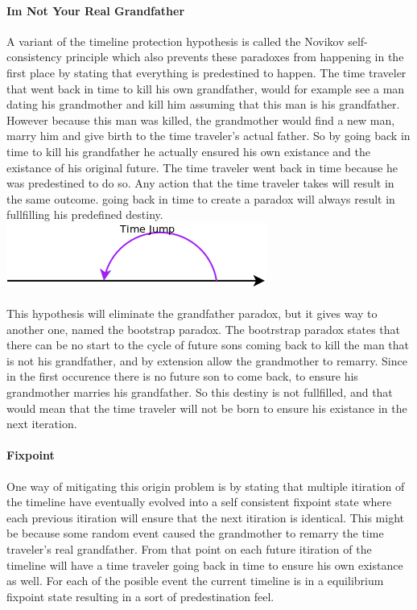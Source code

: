 \paragraph{Im Not Your Real Grandfather}
A variant of the timeline protection hypothesis is called the Novikov self-consistency principle which also prevents these paradoxes from happening in the first place by stating that everything is predestined to happen. The time traveler that went back in time to kill his own grandfather, would for example see a man dating his grandmother and kill him assuming that this man is his grandfather. However because this man was killed, the grandmother would find a new man, marry him and give birth to the time traveler's actual father. So by going back in time to kill his grandfather he actually ensured his own existance and the existance of his original future. The time traveler went back in time because he was predestined to do so. Any action that the time traveler takes will result in the same outcome. going back in time to create a paradox will always result in fullfilling his predefined destiny.
\\
\includegraphics[scale=0.5]{./images/fail.png}
\paragraph{}
This hypothesis will eliminate the grandfather paradox, but it gives way to another one, named the bootstrap paradox. The bootrstrap paradox states that there can be no start to the cycle of future sons coming back to kill the man that is not his grandfather, and by extension allow the grandmother to remarry. Since in the first occurence there is no future son to come back, to ensure his grandmother marries his grandfather. So this destiny is not fullfilled, and that would mean that the time traveler will not be born to ensure his existance in the next iteration.\\

\paragraph{Fixpoint}
One way of mitigating this origin problem is by stating that multiple itiration of the timeline have eventually evolved into a self consistent fixpoint state where each previous itiration will ensure that the next itiration is identical. This might be because some random event caused the grandmother to remarry the time traveler's real grandfather. From that point on each future itiration of the timeline will have a time traveler going back in time to ensure his own existance as well. For each of the posible event the current timeline is in a equilibrium fixpoint state resulting in a sort of predestination feel.


